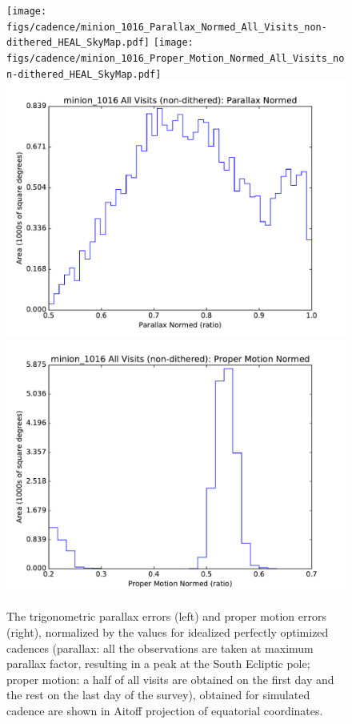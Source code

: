 \begin{figure}[t!]
\vskip -0.0in
\texttt{[image: figs/cadence/minion\_1016\_Parallax\_Normed\_All\_Visits\_non-dithered\_HEAL\_SkyMap.pdf]}
\texttt{[image: figs/cadence/minion\_1016\_Proper\_Motion\_Normed\_All\_Visits\_non-dithered\_HEAL\_SkyMap.pdf]}
\includegraphics[angle=0,width=0.49\hsize,clip]{figs/cadence/minion_1016_Parallax_Normed_All_Visits_non-dithered_HEAL_Histogram.pdf}
\includegraphics[angle=0,width=0.49\hsize,clip]{figs/cadence/minion_1016_Proper_Motion_Normed_All_Visits_non-dithered_HEAL_Histogram.pdf}
\vskip -0.1in
\caption{The trigonometric parallax errors (left) and proper motion errors (right), normalized
by the values for idealized perfectly optimized cadences (parallax: all the observations are taken
at maximum parallax factor, resulting in a peak at the South Ecliptic pole; proper motion:
a half of all visits are obtained on the first day and the rest on the last day of the survey),
obtained for simulated cadence  are shown in Aitoff projection of equatorial
coordinates.}
\label{fig:parapmenigma}
\end{figure}


